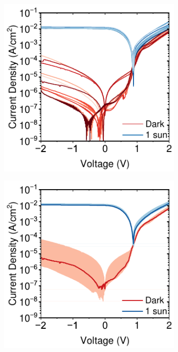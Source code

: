 \begin{figure}[htbp]
    \vspace{1em} %

    \begin{subfigure}[t]{0.4\textwidth}
        \centering
        \includegraphics[width=\textwidth]{chapters/material_properties/images/low_yield_discrete.pdf} %
        \caption{}
        \label{fig:ch2:low_yield_discrete}
    \end{subfigure}
    \hfill
    \begin{subfigure}[t]{0.4\textwidth}
        \centering
        \includegraphics[width=\textwidth]{chapters/material_properties/images/low_yield_median.pdf} %

\end{subfigure}
\end{figure}
